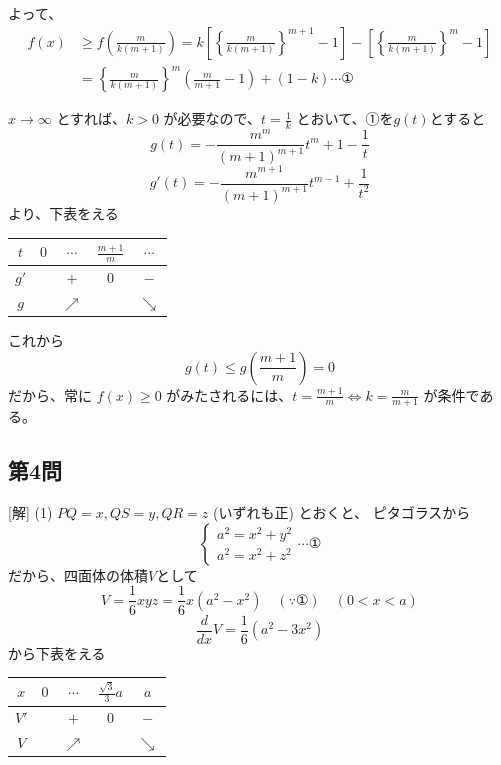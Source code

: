 \documentclass[../main.tex]{subfiles}
\begin{document}
よって、
\begin{align*}
  f(x) &\ge f\left(\frac{m}{k(m+1)}\right) = k \left[ \left\{\frac{m}{k(m+1)}\right\}^{m+1} - 1 \right] - \left[ \left\{\frac{m}{k(m+1)}\right\}^m - 1 \right] \\
  &= \left\{\frac{m}{k(m+1)}\right\}^m \left( \frac{m}{m+1} - 1 \right) + (1-k) \cdots \text{①}
\end{align*}

$x \to \infty$ とすれば、$k > 0$ が必要なので、$t = \frac{1}{k}$ とおいて、①を$g(t)$とすると
\[ g(t) = - \frac{m^m}{(m+1)^{m+1}} t^m + 1 - \frac{1}{t} \]
\[ g'(t) = - \frac{m^{m+1}}{(m+1)^{m+1}} t^{m-1} + \frac{1}{t^2} \]
より、下表をえる

\begin{center}
  \begin{tabular}{|c|c|c|c|c|}
    \hline
    $t$ & $0$ & $\cdots$ & $\frac{m+1}{m}$ & $\cdots$ \\ \hline
    $g'$ & & $+$ & $0$ & $-$ \\ \hline
    $g$ & & $\nearrow$ & & $\searrow$ \\ \hline
  \end{tabular}
\end{center}

これから
\[ g(t) \le g\left(\frac{m+1}{m}\right) = 0 \]
だから、常に $f(x) \ge 0$ がみたされるには、$t = \frac{m+1}{m} \Leftrightarrow k = \frac{m}{m+1}$ が条件である。

\subsection*{第4問}
[解] (1) $PQ = x, QS = y, QR = z$ (いずれも正) とおくと、
ピタゴラスから
\[
  \begin{cases} a^2 = x^2 + y^2 \\ a^2 = x^2 + z^2
\end{cases} \cdots \text{①} \]
だから、四面体の体積$V$として
\[ V = \frac{1}{6}xyz = \frac{1}{6}x(a^2-x^2) \quad (\because \text{①}) \quad (0 < x < a) \]
\[ \frac{d}{dx}V = \frac{1}{6}(a^2-3x^2) \]
から下表をえる

\begin{center}
  \begin{tabular}{|c|c|c|c|c|}
    \hline
    $x$ & $0$ & $\cdots$ & $\frac{\sqrt{3}}{3}a$ & $a$ \\ \hline
    $V'$ & & $+$ & $0$ & $-$ \\ \hline
    $V$ & & $\nearrow$ & & $\searrow$ \\ \hline
  \end{tabular}
\end{center}
\end{document}
